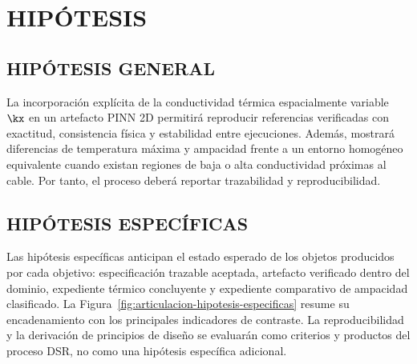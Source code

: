 \section{HIPÓTESIS}

\subsection{HIPÓTESIS GENERAL}

La incorporación explícita de la conductividad térmica espacialmente variable $\kx$ en un artefacto PINN 2D permitirá reproducir referencias verificadas con exactitud, consistencia física y estabilidad entre ejecuciones. Además, mostrará diferencias de temperatura máxima y ampacidad frente a un entorno homogéneo equivalente cuando existan regiones de baja o alta conductividad próximas al cable. Por tanto, el proceso deberá reportar trazabilidad y reproducibilidad.

\subsection{HIPÓTESIS ESPECÍFICAS}

Las hipótesis específicas anticipan el estado esperado de los objetos producidos por cada objetivo: especificación trazable aceptada, artefacto verificado dentro del dominio, expediente térmico concluyente y expediente comparativo de ampacidad clasificado. La Figura~\ref{fig:articulacion-hipotesis-especificas} resume su encadenamiento con los principales indicadores de contraste. La reproducibilidad y la derivación de principios de diseño se evaluarán como criterios y productos del proceso DSR, no como una hipótesis específica adicional.

